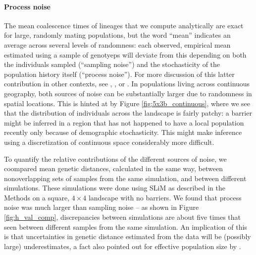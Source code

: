 \documentclass{article}
\begin{document}
\paragraph{Process noise}
The mean coalescence times of lineages that we compute analytically
are exact for large, randomly mating populations,
but the word ``mean'' indicates an average across several levels of randomness:
each observed, empirical mean estimated using a sample of genotyeps
will deviate from this depending on both the individuals sampled (``sampling noise'')
and the stochasticity of the population history itself (``process noise'').
For more discussion of this latter contribution in other contexts, see
\citet{wakeley2012genealogies}, \citet{waples2009modeling}, or \citet{ralph2015empirical}.
In populations living across continuous geography,
both sources of noise can be substantially larger due to randomness in spatial locations.
This is hinted at by Figure \ref{fig:5x3b_continuous},
where we see that the distribution of individuals across the landscape is fairly patchy:
a barrier might be inferred in a region that has not happened to have a local population recently
only because of demographic stochasticity.
This might make inference using a discretization of continuous space considerably more difficult.

To quantify the relative contributions of the different sources of noise,
we coompared mean genetic distances, calculated in the same way,
between nonoverlapping sets of samples from the same simulation,
and between different simulations.
These simulations were done using SLiM as described in the Methods
on a square, $4 \times 4$ landscape with no barriers.
We found that process noise was much larger than sampling noise --
as shown in Figure \ref{fig:h_val_comp},
discrepancies between simulations are about five times that seen
between different samples from the same simulation.
An implication of this is that uncertainties in genetic distance
estimated from the data will be (possibly large) underestimates,
a fact also pointed out for effective population size by \citet{waples}.
\end{document}
